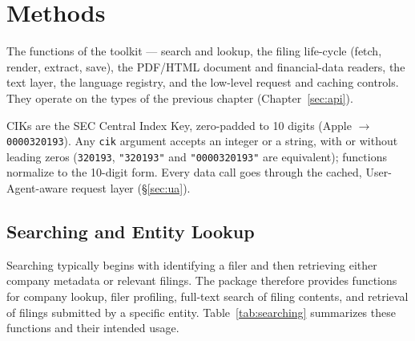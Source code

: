 \documentclass[11pt,a4paper]{report}
\begin{document}
\chapter{Methods}
\label{sec:api-methods}

The functions of the toolkit --- search and lookup, the filing life-cycle (fetch, render, extract, save),
the PDF/HTML document and financial-data readers, the text layer, the language registry, and the low-level
request and caching controls. They operate on the types of the previous chapter (Chapter~\ref{sec:api}).

CIKs are the SEC Central Index Key, zero-padded to 10 digits (Apple $\to$
\texttt{0000320193}). Any \texttt{cik} argument accepts an integer or a string, with
or without leading zeros (\texttt{320193}, \texttt{"320193"} and \texttt{"0000320193"}
are equivalent); functions normalize to the 10-digit form. Every data call goes
through the cached, User-Agent-aware request layer (\S\ref{sec:ua}).

\section{Searching and Entity Lookup}
\label{sec:api-search}

Searching typically begins with identifying a filer and then retrieving either company metadata or relevant filings. The package therefore provides functions for company lookup, filer profiling, full-text search of filing contents, and retrieval of filings submitted by a specific entity. Table~\ref{tab:searching} summarizes these functions and their intended usage.
\end{document}
